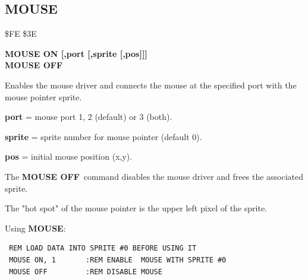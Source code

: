 \newpage
\subsection{MOUSE}
\begin{description}[leftmargin=2cm,style=nextline]
\item [Token:] \$FE \$3E
\item [Format:] {\bf MOUSE ON [,port [,sprite [,pos]]]} \\
                {\bf MOUSE OFF}
\item [Usage:]  Enables the mouse driver
                and connects the mouse at the specified port
                with the mouse pointer sprite.

                {\bf port} = mouse port 1, 2 (default) or 3 (both).

                {\bf sprite} = sprite number for mouse pointer (default 0).

                {\bf pos} = initial mouse position (x,y).

                The {\bf MOUSE OFF} command disables the mouse
                driver and frees the associated sprite.

\item [Remarks:] The "hot spot" of the mouse pointer is the upper left
                pixel of the sprite.

\item [Example:] Using {\bf MOUSE}:
\begin{tcolorbox}[colback=black,coltext=white]
\verbatimfont{\codefont}
\begin{verbatim}
 REM LOAD DATA INTO SPRITE #0 BEFORE USING IT
 MOUSE ON, 1       :REM ENABLE  MOUSE WITH SPRITE #0
 MOUSE OFF         :REM DISABLE MOUSE
\end{verbatim}
\end{tcolorbox}
\end{description}


\newpage
